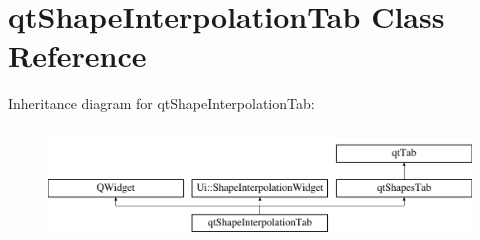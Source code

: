 \hypertarget{classqt_shape_interpolation_tab}{}\section{qt\+Shape\+Interpolation\+Tab Class Reference}
\label{classqt_shape_interpolation_tab}
Inheritance diagram for qt\+Shape\+Interpolation\+Tab\+:\begin{figure}[H]
\begin{center}
\leavevmode
\includegraphics[height=3.000000cm]{classqt_shape_interpolation_tab}
\end{center}
\end{figure}
